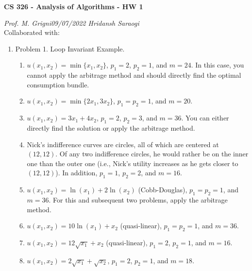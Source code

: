 \documentclass[11pt]{article}
\begin{document}
\begin{center}
    \textbf{CS 326 - Analysis of Algorithms - HW 1}\\
\end{center}


\begin{flushleft}
    \textit{Prof. M. Grigni\hfill09/07/2022 \hfill Hridansh Saraogi} \\
    \vspace{0.15cm}
    \small {Collaborated with: }
\end{flushleft}


\begin{enumerate}

\item Problem 1. Loop Invariant Example.
    \begin{enumerate}
        \item $u(x_{1},x_{2})=\min\{x_{1},x_{2}\}$, $p_{1}=2$, $p_{2}=1$, and $m=24$. In this case, you cannot apply the arbitrage method and should directly find the optimal consumption bundle.

        \item $u(x_{1},x_{2})=\min\{2x_{1},3x_{2}\}$, $p_{1}=p_{2}=1$, and $m=20$.

        \item $u(x_{1},x_{2})=3x_{1}+4x_{2}$, $p_{1}=2$, $p_{2}=3$, and $m=36$. You can either directly find the solution or apply the arbitrage method.


        \item Nick's indifference curves are circles, all of which are centered at $(12,12)$. Of any two indifference circles, he would rather be on the inner one than the outer one (i.e., Nick's utility increases as he gets closer to $(12,12)$). In addition, $p_{1}=1$, $p_{2}=2$, and $m=16$.

        \item $u(x_{1},x_{2})=\ln(x_{1})+2\ln(x_{2})$ (Cobb-Douglas), $p_{1}=p_{2}=1$, and $m=36$. For this and subsequent two problems, apply the arbitrage method.


        \item $u(x_{1},x_{2})=10\ln(x_{1})+x_{2}$ (quasi-linear), $p_{1}=p_{2}=1$, and $m=36$.

        \item $u(x_{1},x_{2})=12\sqrt{x_{1}}+x_{2}$ (quasi-linear), $p_{1}=2$, $p_{2}=1$, and $m=16$.

        \item $u(x_{1},x_{2})=2\sqrt{x_{1}}+\sqrt{x_{2}}$, $p_{1}=2$, $p_{2}=1$, and $m=18$.
    \end{enumerate}


\end{enumerate}
\end{document}
